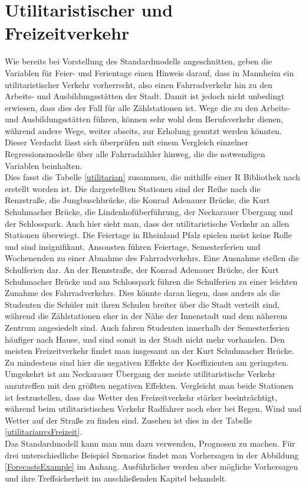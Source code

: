 \documentclass[a4paper,12pt]{thesis}
\begin{document}
\section{Utilitaristischer und Freizeitverkehr}

Wie bereits bei Vorstellung des Standardmodells angeschnitten, geben die Variablen für Feier- und Ferientage einen Hinweis darauf, dass in Mannheim ein utilitaristischer Verkehr vorherrscht, also einen Fahrradverkehr hin zu den Arbeits- und Ausbildungsstätten der Stadt. Damit ist jedoch nicht unbedingt erwiesen, dass dies der Fall für alle Zählstationen ist. Wege die zu den Arbeits- und Ausbildungsstätten führen, können sehr wohl dem Berufsverkehr dienen, während andere Wege, weiter abseits, zur Erholung genutzt werden könnten. Dieser Verdacht lässt sich überprüfen mit einem Vergleich einzelner Regressionsmodelle über alle Fahrradzähler hinweg, die die notwendigen Variablen beinhalten.\\ 
Dies fasst die Tabelle \ref{utilitarian} zusammen, die mithilfe einer R Bibliothek nach \cite{Hlavac2022} erstellt worden ist. Die dargestellten Stationen sind der Reihe nach die Renzstraße, die Jungbuschbrücke, die Konrad Adenauer Brücke, die Kurt Schuhmacher Brücke, die Lindenhofüberführung, der Neckarauer Übergang und der Schlosspark. Auch hier sieht man, dass der utilitaristische Verkehr an allen Stationen überwiegt. Die Feiertage in Rheinland Pfalz spielen meist keine Rolle und sind insignifikant. Ansonsten führen Feiertage, Semesterferien und Wochenenden zu einer Abnahme des Fahrradverkehrs. Eine Ausnahme stellen die Schulferien dar. An der Renzstraße, der Konrad Adenauer Brücke, der Kurt Schuhmacher Brücke und am Schlosspark führen die Schulferien zu einer leichten Zunahme des Fahrradverkehrs. Dies könnte daran liegen, dass anders als die Studenten die Schüler mit ihren Schulen breiter über die Stadt verteilt sind, während die Zählstationen eher in der Nähe der Innenstadt und dem näherem Zentrum angesiedelt sind. Auch fahren Studenten innerhalb der Semesterferien häufiger nach Hause, und sind somit in der Stadt nicht mehr vorhanden. Den meisten Freizeitverkehr findet man insgesamt an der Kurt Schuhmacher Brücke. Zu mindestens sind hier die negativen Effekte der Koeffizienten am geringsten. Umgekehrt ist am Neckarauer Übergang der meiste utilitaristische Verkehr anzutreffen mit den größten negativen Effekten. Vergleicht man beide Stationen ist festzustellen, dass das Wetter den Freizeitverkehr stärker beeinträchtigt, während beim utilitaristischen Verkehr Radfahrer noch eher bei Regen, Wind und Wetter auf der Straße zu finden sind. Zusehen ist dies in der Tabelle \ref{utilitarianvsFreizeit}.\\
Das Standardmodell kann man nun dazu verwenden, Prognosen zu machen. Für drei unterschiedliche Beispiel Szenarios findet man Vorhersagen in der Abbildung \ref{ForecastsExample} im Anhang. Ausführlicher werden aber mögliche Vorhersagen und ihre Treffsicherheit im anschließenden Kapitel behandelt.
\end{document}
